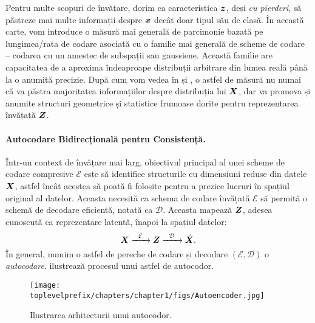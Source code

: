 \documentclass[../../book-main_ro.tex]{subfiles}
\begin{document}
Pentru multe scopuri de învățare, dorim ca caracteristica $\bm{z}$, deși {\em cu pierderi}, să păstreze mai multe informații despre $\bm{x}$ decât doar tipul său de clasă. În această carte, vom introduce o măsură mai generală de parcimonie bazată pe lungimea/rata de codare asociată cu o familie mai generală de scheme de codare -- codarea cu un amestec de subspații sau gaussiene. Această familie are capacitatea de a aproxima îndeaproape distribuții arbitrare din lumea reală până la o anumită precizie. După cum vom vedea în  și , o astfel de măsură nu numai că va păstra majoritatea informațiilor despre distribuția lui $\bm{X}$, dar va promova și anumite structuri geometrice și statistice frumoase dorite pentru reprezentarea învățată $\bm{Z}$.


\paragraph{Autocodare Bidirecțională pentru Consistență.}
Într-un context de învățare mai larg, obiectivul principal al unei scheme de codare compresive $\mathcal{E}$ este să identifice structurile cu dimensiuni reduse din datele $\bm{X}$, astfel încât acestea să poată fi folosite pentru a prezice lucruri în spațiul original al datelor. Aceasta necesită ca schema de codare învățată $\mathcal{E}$ să permită o schemă de decodare eficientă, notată ca $\mathcal D$. Aceasta mapează $\bm{Z}$, adesea cunoscută ca reprezentare latentă, înapoi la spațiul datelor:
\begin{equation}
    \bm{X}   \xrightarrow{\hspace{2mm} \mathcal{E}\hspace{2mm}} \bm{Z}  \xrightarrow{\hspace{2mm} \mathcal{D} \hspace{2mm}} \hat {\bm{X}}.
       \label{eqn:auto-encoding}
\end{equation}
În general, numim o astfel de pereche de codare și decodare $(\mathcal{E}, \mathcal{D})$ o {\em autocodare}.  ilustrează procesul unui astfel de autocodor.
\begin{figure}
    \centering
    \texttt{[image: \\toplevelprefix/chapters/chapter1/figs/Autoencoder.jpg]}
    \caption{Ilustrarea arhitecturii unui autocodor.}
    \label{fig:autoencoder}
\end{figure}
\end{document}

